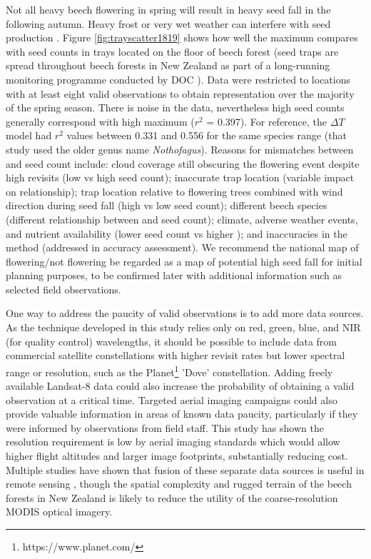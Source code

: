 \documentclass[remotesensing,article,submit,moreauthors,pdftex]{Definitions/mdpi}
\begin{document}
Not all heavy beech flowering in spring will result in heavy seed fall in the following autumn. Heavy frost or very wet weather can interfere with seed production \citep{Wardle1984}.  Figure \ref{fig:trayscatter1819} shows how well the maximum \dndyi{} compares with seed counts in trays located on the floor of beech forest (seed traps are spread throughout beech forests in New Zealand as part of a long-running monitoring programme conducted by DOC \citep{Elliott2016}). Data were restricted to locations with at least eight valid observations to obtain representation over the majority of the spring season. There is noise in the data, nevertheless high seed counts generally correspond with high maximum \dndyi{} ($r^2$ = 0.397). For reference, the $\Delta{T}$ model had $r^2$ values between 0.331 and 0.556 for the same species range \citep{Kelly2013} (that study used the older genus name \emph{Nothofagus}). Reasons for mismatches between \dndyi{} and seed count include: cloud coverage still obscuring the flowering event despite high revisits (low \dndyi{} vs high seed count); inaccurate trap location (variable impact on relationship); trap location relative to flowering trees combined with wind direction during seed fall (high \dndyi{} vs low seed count); different beech species (different relationship between \dndyi{} and seed count); climate, adverse weather events, and nutrient availability (lower seed count vs higher \dndyi{}); and inaccuracies in the method (addressed in accuracy assessment). We recommend the national map of flowering/not flowering be regarded as a map of potential high seed fall for initial planning purposes, to be confirmed later with additional information such as selected field observations. 

One way to address the paucity of valid observations is to add more data sources. As the technique developed in this study relies only on red, green, blue, and NIR (for quality control) wavelengths, it should be possible to include data from commercial satellite constellations with higher revisit rates but lower spectral range or resolution, such as the Planet\footnote{https://www.planet.com/} 'Dove' constellation. Adding freely available Landsat-8 data could also increase the probability of obtaining a valid observation at a critical time. Targeted aerial imaging campaigns could also provide valuable information in areas of known data paucity, particularly if they were informed by observations from field staff. This study has shown the resolution requirement is low by aerial imaging standards which would allow higher flight altitudes and larger image footprints, substantially reducing cost. Multiple studies have shown that fusion of these separate data sources is useful in remote sensing \citep{Bolton2020,Cheng2020,Thapa2021,Peng2021,Dixon2021,Moon2021Multiscale}, though the spatial complexity and rugged terrain of the beech forests in New Zealand is likely to reduce the utility of the coarse-resolution MODIS optical imagery.
\end{document}
